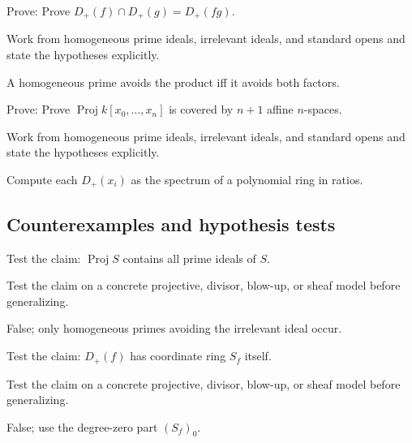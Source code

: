 \begin{exercise}[Intersection]\label{exr:vi35-expand-08}
Prove: Prove $D_+(f)\cap D_+(g)=D_+(fg)$.
\end{exercise}
\begin{hint}
Work from homogeneous prime ideals, irrelevant ideals, and standard opens and state the hypotheses explicitly.
\end{hint}
\begin{solution}
A homogeneous prime avoids the product iff it avoids both factors.
\end{solution}

\begin{exercise}\label{exr:vi35-expand-09}
Prove: Prove $\operatorname{Proj}k[x_0,\ldots,x_n]$ is covered by $n+1$ affine $n$-spaces.
\end{exercise}
\begin{hint}
Work from homogeneous prime ideals, irrelevant ideals, and standard opens and state the hypotheses explicitly.
\end{hint}
\begin{solution}
Compute each $D_+(x_i)$ as the spectrum of a polynomial ring in ratios.
\end{solution}

\subsection*{Counterexamples and hypothesis tests}

\begin{exercise}\label{exr:vi35-expand-10}
Test the claim: $\operatorname{Proj}S$ contains all prime ideals of $S$.
\end{exercise}
\begin{hint}
Test the claim on a concrete projective, divisor, blow-up, or sheaf model before generalizing.
\end{hint}
\begin{solution}
False; only homogeneous primes avoiding the irrelevant ideal occur.
\end{solution}

\begin{exercise}\label{exr:vi35-expand-11}
Test the claim: $D_+(f)$ has coordinate ring $S_f$ itself.
\end{exercise}
\begin{hint}
Test the claim on a concrete projective, divisor, blow-up, or sheaf model before generalizing.
\end{hint}
\begin{solution}
False; use the degree-zero part $(S_f)_0$.
\end{solution}

